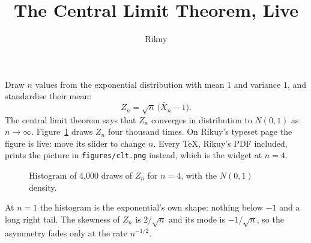 \documentclass[11pt]{article}
\title{The Central Limit Theorem, Live}
\author{Rikuy}
\date{}
\begin{document}
\maketitle

Draw $n$ values from the exponential distribution with mean $1$ and variance $1$, and standardise their mean:
\[
  Z_n = \sqrt{n}\,\bigl(\bar X_n - 1\bigr).
\]
The central limit theorem says that $Z_n$ converges in distribution to $N(0,1)$ as $n \to \infty$. Figure~\ref{fig:clt} draws $Z_n$ four thousand times. On Rikuy's typeset page the figure is live: move its slider to change $n$. Every \TeX{}, Rikuy's PDF included, prints the picture in \texttt{figures/clt.png} instead, which is the widget at $n = 4$.

\begin{figure}[ht]
  \centering
  \caption{Histogram of 4,000 draws of $Z_n$ for $n = 4$, with the $N(0,1)$ density.}
  \label{fig:clt}
\end{figure}

At $n = 1$ the histogram is the exponential's own shape: nothing below $-1$ and a long right tail. The skewness of $Z_n$ is $2/\sqrt{n}$ and its mode is $-1/\sqrt{n}$, so the asymmetry fades only at the rate $n^{-1/2}$.
\end{document}
